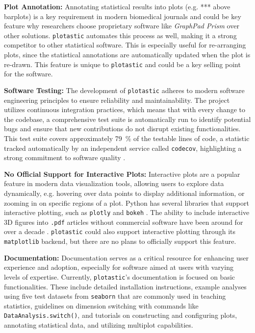 \textbf{Plot Annotation:} Annotating statistical results into plots (e.g. ***
above barplots) is a key requirement in modern biomedical journals and could be
key feature why researchers choose proprietary software like \textit{GraphPad
    Prism} over other solutions. \texttt{plotastic} automates this process as well,
making it a strong competitor to other statistical software. This is especially
useful for re-arranging plots, since the statistical annotations are
automatically updated when the plot is re-drawn. This feature is unique to
\texttt{plotastic} and could be a key selling point for the software.


\textbf{Software Testing:} The development of \texttt{plotastic} adheres to
modern software engineering principles to ensure reliability and
maintainability. The project utilizes continuous integration practices, which
means that with every change to the codebase, a comprehensive test suite is
automatically run to identify potential bugs and ensure that new contributions
do not disrupt existing functionalities. This test suite covers approximately
\SI{79}{\percent} of the testable lines of code, a statistic tracked
automatically by an independent service called \texttt{codecov}, highlighting a
strong commitment to software quality \cite{Codecov2024}.

\textbf{No Official Support for Interactive Plots:} Interactive plots are a popular feature
in modern data visualization tools, allowing users to explore data dynamically,
e.g. hovering over data points to display additional information, or zooming in
on specific regions of a plot. Python has several libraries that support
interactive plotting, such as \texttt{plotly} and \texttt{bokeh}
\cite{plotly,bokehdevelopmentteamBokehPythonLibrary2018}. The ability to include
interactive 3D figures into \texttt{.pdf} articles without commercial software
have been around for over a decade
\cite{barnesEmbeddingPublishingInteractive2013}. \texttt{plotastic} could
also support interactive plotting through its \texttt{matplotlib} backend,
but there are no plans to officially support this feature.

\textbf{Documentation:}
Documentation serves as a critical resource for enhancing user experience and
adoption, especially for software aimed at users with varying levels of
expertise. Currently, \texttt{plotastic}'s documentation is focused on basic
functionalities. These include detailed installation instructions, example
analyses using five test datasets from \texttt{seaborn} that are commonly used
in teaching statistics, guidelines on dimension switching with commands like
\texttt{DataAnalysis.switch()}, and tutorials on constructing and configuring
plots, annotating statistical data, and utilizing multiplot capabilities.

